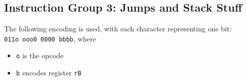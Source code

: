 \documentclass{article}
\begin{document}
\begin{itemize}
	\end{itemize}

	\doublespacing
	\subsection{Instruction Group 3:  Jumps and Stack Stuff}
	The following encoding is used, with each character representing one
	bit:  \\
	\texttt{011o ooo0 0000 bbbb}, where

	\singlespacing
	\begin{itemize}
		\item \texttt{o} is the opcode
		\item \texttt{b} encodes register \texttt{rB}
	\end{itemize}

	\doublespacing

\end{document}
